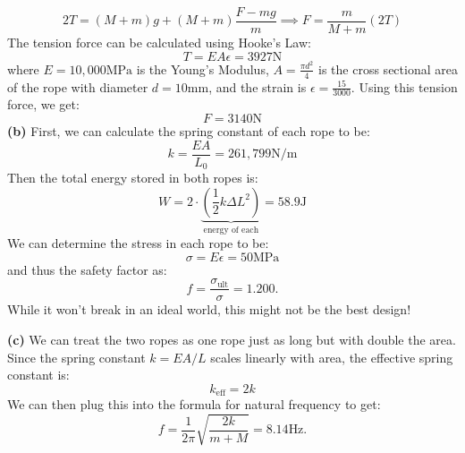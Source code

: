 \documentclass{article}
\begin{document}
\begin{equation}
    2T=(M+m)g+(M+m)\frac{F-mg}{m} \implies F = \frac{m}{M+m}(2T)
    \label{eq:}
\end{equation}
The tension force can be calculated using Hooke's Law:
\begin{equation}
    T = EA\epsilon = 3927\si{\newton}
    \label{eq:alambert-tension}
\end{equation}
where $E=10,000\si{\mega\pascal}$ is the Young's Modulus, $A=\frac{\pi d^2}{4}$ is the cross sectional area of the rope with diameter $d=10\si{\milli\meter}$, and the strain is $\epsilon=\frac{15}{3000}$. Using this tension force, we get:
\begin{equation}
    \boxed{F=3140\si{\newton}}
    \label{eq:}
\end{equation}
\textbf{(b)} First, we can calculate the spring constant of each rope to be:
\begin{equation}
    k = \frac{EA}{L_0} = 261,799 \si{\newton\per\meter}
    \label{eq:}
\end{equation}
Then the total energy stored in both ropes is:
\begin{equation}
    W = 2 \cdot \underbrace{\left(\frac{1}{2}k\Delta L^2\right)}_\text{energy of each} = \boxed{58.9\si{\joule}}
    \label{eq:}
\end{equation}
We can determine the stress in each rope to be:
\begin{equation}
    \sigma = E\epsilon = 50\si{\mega\pascal}
    \label{eq:}
\end{equation}
and thus the safety factor as:
\begin{equation}
    f = \frac{\sigma_\text{ult}}{\sigma} = \boxed{1.200}.
    \label{eq:}
\end{equation}
While it won't break in an ideal world, this might not be the best design!

\textbf{(c)} We can treat the two ropes as one rope just as long but with double the area. Since the spring constant $k=EA/L$ scales linearly with area, the effective spring constant is:
\begin{equation}
    k_\text{eff} = 2k
    \label{eq:}
\end{equation}
We can then plug this into the formula for natural frequency to get:
\begin{equation}
    f = \frac{1}{2\pi}\sqrt{\frac{2k}{m+M}} = \boxed{8.14\si{\hertz}}.
    \label{eq:}
\end{equation}
\newpage
\end{document}
